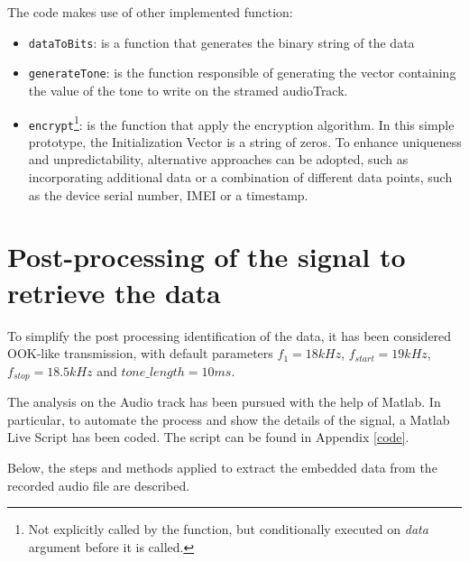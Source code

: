 The code makes use of other implemented function:
\begin{itemize}
    \item \texttt{dataToBits}: is a function that generates the binary string of the data
    \item  \texttt{generateTone}: is the function responsible of generating the vector containing the value of the tone to write on the stramed audioTrack.
    \item \texttt{encrypt}\footnote{Not explicitly called by the function, but conditionally executed on \textit{data} argument before it is called.}: is the function that apply the encryption algorithm. In this simple prototype, the Initialization Vector is a string of zeros. To enhance uniqueness and unpredictability, alternative approaches can be adopted, such as incorporating additional data or a combination of different data points, such as the device serial number, IMEI or a timestamp.
\end{itemize}

\section{Post-processing of the signal to retrieve the data}
To simplify the post processing identification of the data, it has been considered OOK-like transmission, with default parameters $f_{1}=18 kHz$, $f_{start}=19 kHz$, $f_{stop}=18.5 kHz$ and $tone\_length = 10 ms$. 

The analysis on the Audio track has been pursued with the help of Matlab. In particular, to automate the process and show the details of the signal, a Matlab Live Script has been coded. The script can be found in Appendix \ref{code}.

Below, the steps and methods applied to extract the embedded data from the recorded audio file are described.

